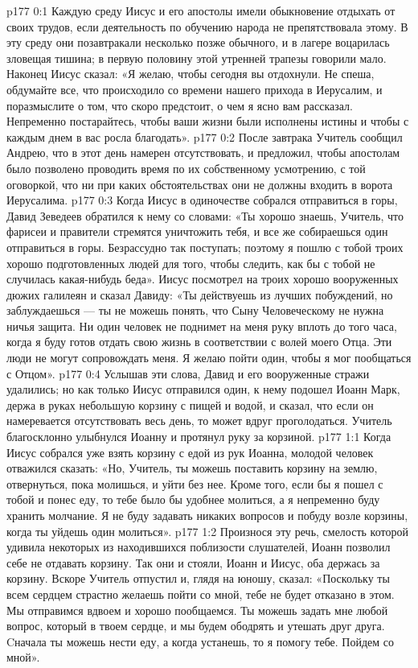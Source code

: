 \author{Комиссия срединников}
\vs p177 0:1 Каждую среду Иисус и его апостолы имели обыкновение отдыхать от своих трудов, если деятельность по обучению народа не препятствовала этому. В эту среду они позавтракали несколько позже обычного, и в лагере воцарилась зловещая тишина; в первую половину этой утренней трапезы говорили мало. Наконец Иисус сказал: «Я желаю, чтобы сегодня вы отдохнули. Не спеша, обдумайте все, что происходило со времени нашего прихода в Иерусалим, и поразмыслите о том, что скоро предстоит, о чем я ясно вам рассказал. Непременно постарайтесь, чтобы ваши жизни были исполнены истины и чтобы с каждым днем в вас росла благодать».
\vs p177 0:2 После завтрака Учитель сообщил Андрею, что в этот день намерен отсутствовать, и предложил, чтобы апостолам было позволено проводить время по их собственному усмотрению, с той оговоркой, что ни при каких обстоятельствах они не должны входить в ворота Иерусалима.
\vs p177 0:3 Когда Иисус в одиночестве собрался отправиться в горы, Давид Зеведеев обратился к нему со словами: «Ты хорошо знаешь, Учитель, что фарисеи и правители стремятся уничтожить тебя, и все же собираешься один отправиться в горы. Безрассудно так поступать; поэтому я пошлю с тобой троих хорошо подготовленных людей для того, чтобы следить, как бы с тобой не случилась какая\hyp{}нибудь беда». Иисус посмотрел на троих хорошо вооруженных дюжих галилеян и сказал Давиду: «Ты действуешь из лучших побуждений, но заблуждаешься --- ты не можешь понять, что Сыну Человеческому не нужна ничья защита. Ни один человек не поднимет на меня руку вплоть до того часа, когда я буду готов отдать свою жизнь в соответствии с волей моего Отца. Эти люди не могут сопровождать меня. Я желаю пойти один, чтобы я мог пообщаться с Отцом».
\vs p177 0:4 Услышав эти слова, Давид и его вооруженные стражи удалились; но как только Иисус отправился один, к нему подошел Иоанн Марк, держа в руках небольшую корзину с пищей и водой, и сказал, что если он намеревается отсутствовать весь день, то может вдруг проголодаться. Учитель благосклонно улыбнулся Иоанну и протянул руку за корзиной.
\vs p177 1:1 Когда Иисус собрался уже взять корзину с едой из рук Иоанна, молодой человек отважился сказать: «Но, Учитель, ты можешь поставить корзину на землю, отвернуться, пока молишься, и уйти без нее. Кроме того, если бы я пошел с тобой и понес еду, то тебе было бы удобнее молиться, а я непременно буду хранить молчание. Я не буду задавать никаких вопросов и побуду возле корзины, когда ты уйдешь один молиться».
\vs p177 1:2 Произнося эту речь, смелость которой удивила некоторых из находившихся поблизости слушателей, Иоанн позволил себе не отдавать корзину. Так они и стояли, Иоанн и Иисус, оба держась за корзину. Вскоре Учитель отпустил и, глядя на юношу, сказал: «Поскольку ты всем сердцем страстно желаешь пойти со мной, тебе не будет отказано в этом. Мы отправимся вдвоем и хорошо пообщаемся. Ты можешь задать мне любой вопрос, который в твоем сердце, и мы будем ободрять и утешать друг друга. Cначала ты можешь нести еду, а когда устанешь, то я помогу тебе. Пойдем со мной».
